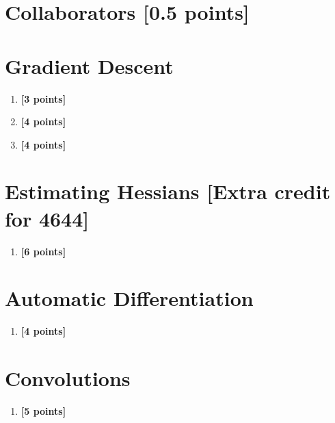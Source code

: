 \documentclass[11pt,english]{article}
\begin{document}

\section{Collaborators [0.5 points]}




\section{Gradient Descent}
\begin{enumerate}[start]

\item
\textbf{[3 points]}


\item
\textbf{[4 points]}


\item
\textbf{[4 points]}


\end{enumerate}


\section{Estimating Hessians [Extra credit for 4644]}
\begin{enumerate}[resume]

\item
\textbf{[6 points]}


\end{enumerate}


\section{Automatic Differentiation}
\begin{enumerate}[resume]

\item
\textbf{[4 points]}


\end{enumerate}

\section{Convolutions}
\begin{enumerate}[resume]

\item 
\textbf{[5 points]}


\end{enumerate}
\end{document}
